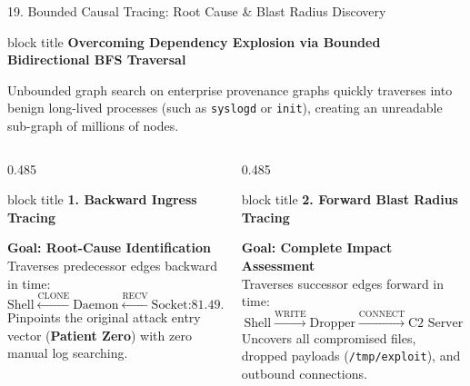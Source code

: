 \documentclass[aspectratio=169,10pt]{beamer}
\begin{document}
\begin{frame}[t]{19. Bounded Causal Tracing: Root Cause \& Blast Radius Discovery}
\vspace{-0.2em}
\begin{beamercolorbox}[rounded=true,shadow=false,sep=0.30em,wd=\textwidth]{block title}
\textbf{\scriptsize Overcoming Dependency Explosion via Bounded Bidirectional BFS Traversal}
\end{beamercolorbox}
\vspace{0.10em}
{\fontsize{7.2pt}{10.2pt}\selectfont
Unbounded graph search on enterprise provenance graphs quickly traverses into benign long-lived processes (such as \texttt{syslogd} or \texttt{init}), creating an unreadable sub-graph of millions of nodes.
}

\vspace{0.25em}

\begin{columns}[T]
\begin{column}{0.485\textwidth}
\begin{beamercolorbox}[rounded=true,shadow=false,sep=0.28em,wd=\linewidth]{block title}
\textbf{\scriptsize 1. Backward Ingress Tracing}
\end{beamercolorbox}
\vspace{0.08em}
{\fontsize{6.8pt}{9.4pt}\selectfont
\textbf{Goal: Root-Cause Identification}\\
Traverses predecessor edges backward in time:
\[
\text{Shell} \xleftarrow{\text{CLONE}} \text{Daemon} \xleftarrow{\text{RECV}} \text{Socket:81.49.200.166}
\]
Pinpoints the original attack entry vector (\textbf{Patient Zero}) with zero manual log searching.
}
\end{column}

\begin{column}{0.485\textwidth}
\begin{beamercolorbox}[rounded=true,shadow=false,sep=0.28em,wd=\linewidth]{block title}
\textbf{\scriptsize 2. Forward Blast Radius Tracing}
\end{beamercolorbox}
\vspace{0.08em}
{\fontsize{6.8pt}{9.4pt}\selectfont
\textbf{Goal: Complete Impact Assessment}\\
Traverses successor edges forward in time:
\[
\text{Shell} \xrightarrow{\text{WRITE}} \text{Dropper} \xrightarrow{\text{CONNECT}} \text{C2 Server}
\]
Uncovers all compromised files, dropped payloads (\texttt{/tmp/exploit}), and outbound connections.
}
\end{column}
\end{columns}


\end{frame}
\end{document}
